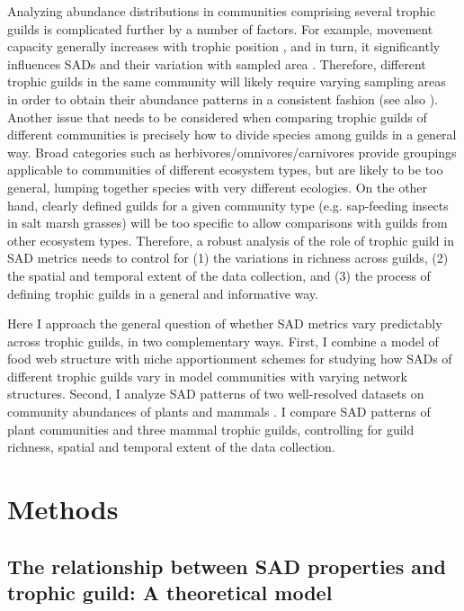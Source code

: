 Analyzing abundance distributions in communities comprising several trophic guilds is complicated further by a number of factors. For example, movement capacity generally increases with trophic position \citep{McCann2005}, and in turn, it significantly influences SADs and their variation with sampled area \citep{Borda-de-Agua2017}. Therefore, different trophic guilds in the same community will likely require varying sampling areas in order to obtain their abundance patterns in a consistent fashion (see also \citealt{Holt1999}). Another issue that needs to be considered when comparing trophic guilds of different communities is precisely how to divide species among guilds in a general way. Broad categories such as herbivores/omnivores/carnivores provide groupings applicable to communities of different ecosystem types, but are likely to be too general, lumping together species with very different ecologies. On the other hand, clearly defined guilds for a given community type (e.g. sap-feeding insects in salt marsh grasses) will be too specific to allow comparisons with guilds from other ecosystem types. Therefore, a robust analysis of the role of trophic guild in SAD metrics needs to control for (1) the variations in richness across guilds, (2) the spatial and temporal extent of the data collection, and (3) the process of defining trophic guilds in a general and informative way.

Here I approach the general question of whether SAD metrics vary predictably across trophic guilds, in two complementary ways. First, I combine a model of food web structure with niche apportionment schemes for studying how SADs of different trophic guilds vary in model communities with varying network structures. Second, I analyze SAD patterns of two well-resolved datasets on community abundances of plants \citep{Phillips2002} and mammals \citep{Thibault2011}. I compare SAD patterns of plant communities and three mammal trophic guilds, controlling for guild richness, spatial and temporal extent of the data collection.

\section*{Methods}

\subsection*{The relationship between SAD properties and trophic guild: A theoretical model}

